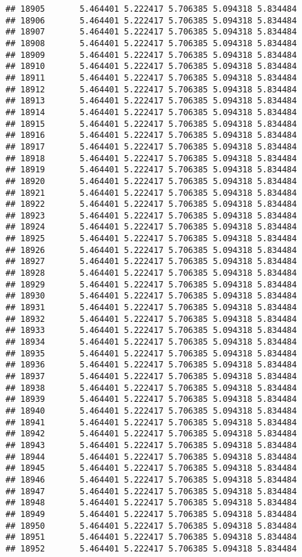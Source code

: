 \documentclass[
]{article}
\begin{document}
\begin{verbatim}
## 18905       5.464401 5.222417 5.706385 5.094318 5.834484
## 18906       5.464401 5.222417 5.706385 5.094318 5.834484
## 18907       5.464401 5.222417 5.706385 5.094318 5.834484
## 18908       5.464401 5.222417 5.706385 5.094318 5.834484
## 18909       5.464401 5.222417 5.706385 5.094318 5.834484
## 18910       5.464401 5.222417 5.706385 5.094318 5.834484
## 18911       5.464401 5.222417 5.706385 5.094318 5.834484
## 18912       5.464401 5.222417 5.706385 5.094318 5.834484
## 18913       5.464401 5.222417 5.706385 5.094318 5.834484
## 18914       5.464401 5.222417 5.706385 5.094318 5.834484
## 18915       5.464401 5.222417 5.706385 5.094318 5.834484
## 18916       5.464401 5.222417 5.706385 5.094318 5.834484
## 18917       5.464401 5.222417 5.706385 5.094318 5.834484
## 18918       5.464401 5.222417 5.706385 5.094318 5.834484
## 18919       5.464401 5.222417 5.706385 5.094318 5.834484
## 18920       5.464401 5.222417 5.706385 5.094318 5.834484
## 18921       5.464401 5.222417 5.706385 5.094318 5.834484
## 18922       5.464401 5.222417 5.706385 5.094318 5.834484
## 18923       5.464401 5.222417 5.706385 5.094318 5.834484
## 18924       5.464401 5.222417 5.706385 5.094318 5.834484
## 18925       5.464401 5.222417 5.706385 5.094318 5.834484
## 18926       5.464401 5.222417 5.706385 5.094318 5.834484
## 18927       5.464401 5.222417 5.706385 5.094318 5.834484
## 18928       5.464401 5.222417 5.706385 5.094318 5.834484
## 18929       5.464401 5.222417 5.706385 5.094318 5.834484
## 18930       5.464401 5.222417 5.706385 5.094318 5.834484
## 18931       5.464401 5.222417 5.706385 5.094318 5.834484
## 18932       5.464401 5.222417 5.706385 5.094318 5.834484
## 18933       5.464401 5.222417 5.706385 5.094318 5.834484
## 18934       5.464401 5.222417 5.706385 5.094318 5.834484
## 18935       5.464401 5.222417 5.706385 5.094318 5.834484
## 18936       5.464401 5.222417 5.706385 5.094318 5.834484
## 18937       5.464401 5.222417 5.706385 5.094318 5.834484
## 18938       5.464401 5.222417 5.706385 5.094318 5.834484
## 18939       5.464401 5.222417 5.706385 5.094318 5.834484
## 18940       5.464401 5.222417 5.706385 5.094318 5.834484
## 18941       5.464401 5.222417 5.706385 5.094318 5.834484
## 18942       5.464401 5.222417 5.706385 5.094318 5.834484
## 18943       5.464401 5.222417 5.706385 5.094318 5.834484
## 18944       5.464401 5.222417 5.706385 5.094318 5.834484
## 18945       5.464401 5.222417 5.706385 5.094318 5.834484
## 18946       5.464401 5.222417 5.706385 5.094318 5.834484
## 18947       5.464401 5.222417 5.706385 5.094318 5.834484
## 18948       5.464401 5.222417 5.706385 5.094318 5.834484
## 18949       5.464401 5.222417 5.706385 5.094318 5.834484
## 18950       5.464401 5.222417 5.706385 5.094318 5.834484
## 18951       5.464401 5.222417 5.706385 5.094318 5.834484
## 18952       5.464401 5.222417 5.706385 5.094318 5.834484
\end{verbatim}
\end{document}
